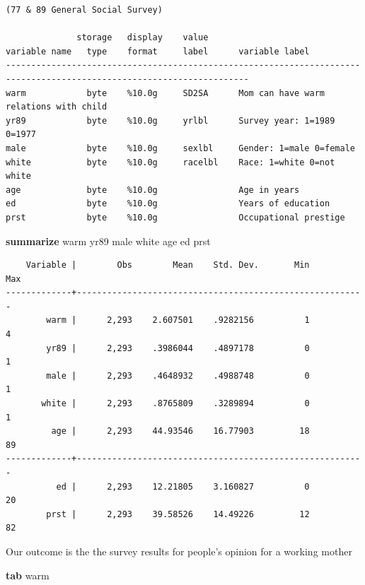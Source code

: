\documentclass[
]{book}
\newenvironment{Shaded}{\begin{snugshade}}{\end{snugshade}}
\newcommand{\BaseNTok}[1]{\textcolor[rgb]{0.00,0.00,0.81}{#1}}
\newcommand{\KeywordTok}[1]{\textcolor[rgb]{0.13,0.29,0.53}{\textbf{#1}}}
\newcommand{\NormalTok}[1]{#1}
\begin{document}
\begin{verbatim}
(77 & 89 General Social Survey)

              storage   display    value
variable name   type    format     label      variable label
----------------------------------------------------------------------------------------------------------------------
warm            byte    %10.0g     SD2SA      Mom can have warm relations with child
yr89            byte    %10.0g     yrlbl      Survey year: 1=1989 0=1977
male            byte    %10.0g     sexlbl     Gender: 1=male 0=female
white           byte    %10.0g     racelbl    Race: 1=white 0=not white
age             byte    %10.0g                Age in years
ed              byte    %10.0g                Years of education
prst            byte    %10.0g                Occupational prestige
\end{verbatim}

\begin{Shaded}
\begin{Highlighting}[]
\KeywordTok{summarize}\NormalTok{ warm yr89 male }\BaseNTok{white}\NormalTok{ age ed prst}
\end{Highlighting}
\end{Shaded}

\begin{verbatim}
    Variable |        Obs        Mean    Std. Dev.       Min        Max
-------------+---------------------------------------------------------
        warm |      2,293    2.607501    .9282156          1          4
        yr89 |      2,293    .3986044    .4897178          0          1
        male |      2,293    .4648932    .4988748          0          1
       white |      2,293    .8765809    .3289894          0          1
         age |      2,293    44.93546    16.77903         18         89
-------------+---------------------------------------------------------
          ed |      2,293    12.21805    3.160827          0         20
        prst |      2,293    39.58526    14.49226         12         82
\end{verbatim}

Our outcome is the the survey results for people's opinion for a working mother

\begin{Shaded}
\begin{Highlighting}[]
\KeywordTok{tab}\NormalTok{ warm}
\end{Highlighting}
\end{Shaded}
\end{document}
